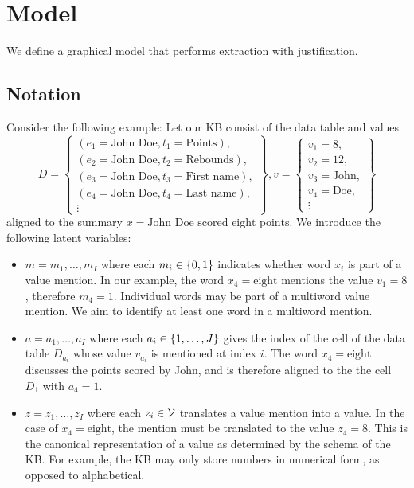 \documentclass[12pt]{article}
\begin{document}
\section{Model}
We define a graphical model that performs extraction with justification.
\subsection{Notation}
Consider the following example:
Let our KB consist of the data table and values
$$
D = \left\{\begin{array}{c}
    (e_1 = \textrm{John Doe}, t_1 = \textrm{Points}), \\
    (e_2 = \textrm{John Doe}, t_2 = \textrm{Rebounds}), \\
    (e_3 = \textrm{John Doe}, t_3 = \textrm{First name}),\\
    (e_4 = \textrm{John Doe}, t_4 = \textrm{Last name}), \\
    \vdots
\end{array}\right\},
v = \left\{\begin{array}{c}
v_1 = 8,\\
v_2 = 12,\\
v_3 = \textrm{John},\\
v_4 = \textrm{Doe},\\
\vdots 
\end{array}\right\}
$$
aligned to the summary $x = \textrm{John Doe scored eight points}$.
We introduce the following latent variables:
\begin{itemize}
\item $m = m_1, \ldots, m_I$ where each $m_i \in \left\{0,1\right\}$
    indicates whether word $x_i$ is part of a value mention.
    In our example, the word $x_4 = \textrm{eight}$
    mentions the value $v_1 = 8$, therefore $m_4 = 1$.
    Individual words may be part of a multiword value mention.
    We aim to identify at least one word in a multiword mention.
\item $a = a_1, \ldots, a_I$ where each $a_i \in \left\{1, \ldots, J\right\}$
    gives the index of the cell of the data table $D_{a_i}$ whose
    value $v_{a_i}$ is mentioned at index $i$.
    The word $x_4 = \textrm{eight}$ discusses the points scored by John,
    and is therefore aligned to the the cell $D_{1}$
    with $a_4 = 1$.
\item $z = z_1, \ldots, z_I$ where each $z_i \in \mathcal{V}$
    translates a value mention into a value.
    In the case of $x_4 = \textrm{eight}$, the mention must
    be translated to the value $z_4 = 8$.
    This is the canonical representation of
    a value as determined by the schema of the KB.
    For example, the KB may only store numbers in numerical form,
    as opposed to alphabetical.
\end{itemize}
\end{document}
